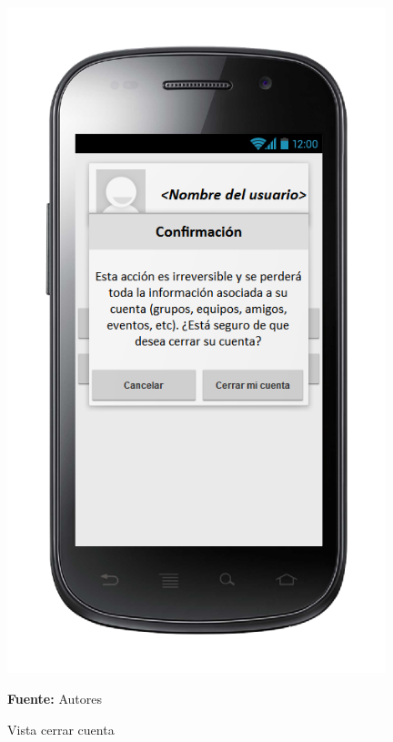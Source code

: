 \begin{figure}[!htb]
  \begin{center}
\includegraphics[width=11cm]{./imagenes/UI/Usuarios/cerrar_cuenta.png}
    \caption{Vista cerrar cuenta}
    \label{fig:Vista_cerrar_cuenta}
    \textbf{Fuente:}  Autores
  \end{center}
\end{figure}
